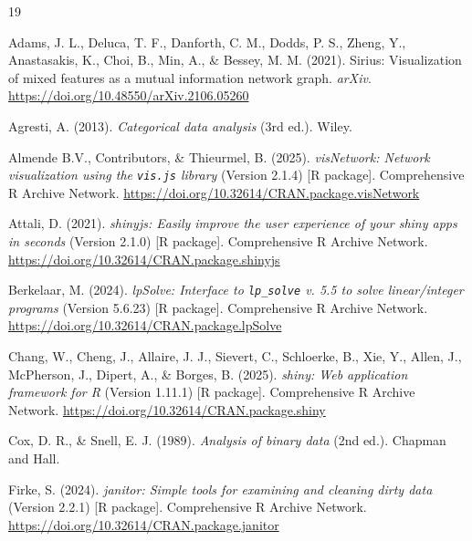 \documentclass[11pt]{article}
\newcommand{\code}[1]{\texttt{#1}}
\newcommand{\pkg}[1]{\textsf{#1}}
\newcommand{\proglang}[1]{\textsf{#1}}
\newcommand{\doi}[1]{\href{https://doi.org/#1}{https://doi.org/#1}}
\begin{document}
\begin{thebibliography}{19}
\setlength{\itemsep}{0.5\baselineskip}

Adams, J. L., Deluca, T. F., Danforth, C. M., Dodds, P. S., Zheng, Y.,
Anastasakis, K., Choi, B., Min, A., \& Bessey, M. M. (2021).
\newblock Sirius: Visualization of mixed features as a mutual information
network graph.
\newblock \emph{arXiv}. \doi{10.48550/arXiv.2106.05260}

Agresti, A. (2013).
\newblock \emph{Categorical data analysis} (3rd ed.).
\newblock Wiley.

Almende B.V., Contributors, \& Thieurmel, B. (2025).
\newblock \emph{\pkg{visNetwork}: Network visualization using the \code{vis.js}
library} (Version 2.1.4) [\proglang{R} package].
\newblock Comprehensive \proglang{R} Archive Network. \doi{10.32614/CRAN.package.visNetwork}

Attali, D. (2021).
\newblock \emph{\pkg{shinyjs}: Easily improve the user experience of your
\pkg{shiny} apps in seconds} (Version 2.1.0) [\proglang{R} package].
\newblock Comprehensive \proglang{R} Archive Network. \doi{10.32614/CRAN.package.shinyjs}

Berkelaar, M. (2024).
\newblock \emph{\pkg{lpSolve}: Interface to \code{lp\_solve} v. 5.5 to solve
linear/integer programs} (Version 5.6.23) [\proglang{R} package].
\newblock Comprehensive \proglang{R} Archive Network. \doi{10.32614/CRAN.package.lpSolve}

Chang, W., Cheng, J., Allaire, J. J., Sievert, C., Schloerke, B., Xie, Y.,
Allen, J., McPherson, J., Dipert, A., \& Borges, B. (2025).
\newblock \emph{\pkg{shiny}: Web application framework for \proglang{R}}
(Version 1.11.1) [\proglang{R} package].
\newblock Comprehensive \proglang{R} Archive Network. \doi{10.32614/CRAN.package.shiny}

Cox, D. R., \& Snell, E. J. (1989).
\newblock \emph{Analysis of binary data} (2nd ed.).
\newblock Chapman and Hall.

Firke, S. (2024).
\newblock \emph{\pkg{janitor}: Simple tools for examining and cleaning dirty
data} (Version 2.2.1) [\proglang{R} package].
\newblock Comprehensive \proglang{R} Archive Network. \doi{10.32614/CRAN.package.janitor}


\end{thebibliography}
\end{document}

